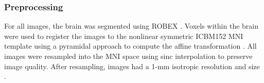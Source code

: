 \subsubsection{Preprocessing}
\label{sec:preprocessing}

For all images, the brain was segmented using ROBEX \cite{iglesias_robust_2011}.
Voxels within the brain were used to register the images to the nonlinear symmetric ICBM152 \ac{MNI} template \cite{fonov_unbiased_2009,fonov_unbiased_2011} using a pyramidal approach to compute the affine transformation \cite{modat_global_2014}.
All images were resampled into the \ac{MNI} space using sinc interpolation to preserve image quality.
After resampling, images had a 1-mm isotropic resolution and size .

